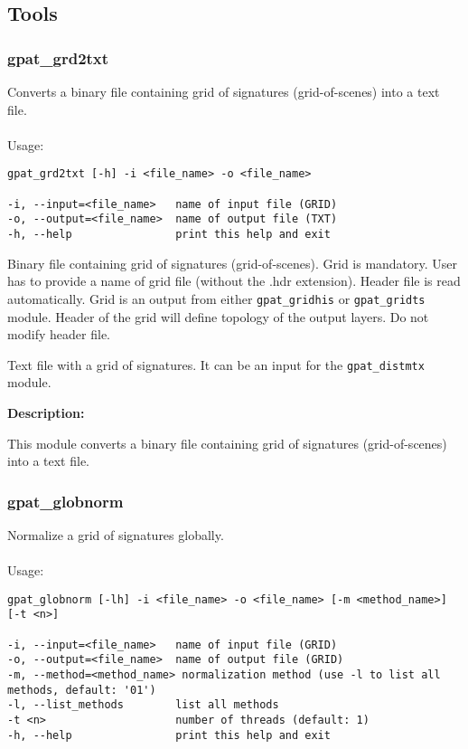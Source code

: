 \subsection{Tools}
\subsubsection{gpat\_grd2txt}
Converts a binary file containing grid of signatures (grid-of-scenes) into a text file.
\\\\
Usage:

\begin{minipage}{\linewidth}
\begin{lstlisting}
gpat_grd2txt [-h] -i <file_name> -o <file_name>

-i, --input=<file_name>   name of input file (GRID)
-o, --output=<file_name>  name of output file (TXT)
-h, --help                print this help and exit
\end{lstlisting}
\end{minipage}


Binary file containing grid of signatures (grid-of-scenes). 
Grid is mandatory. 
User has to provide a name of grid file (without the .hdr extension). 
Header file is read automatically. 
Grid is an output from either {\tt gpat\_gridhis} or {\tt gpat\_gridts} module. 
Header of the grid will define topology of the output layers. 
Do not modify header file.


Text file with a grid of signatures. 
It can be an input for the {\tt gpat\_distmtx} module.

{\bf Description:}

This module converts a binary file containing grid of signatures (grid-of-scenes) into a text file.

\subsubsection{gpat\_globnorm}
Normalize a grid of signatures globally. 
\\\\
Usage:

\begin{minipage}{\linewidth}
\begin{lstlisting}
gpat_globnorm [-lh] -i <file_name> -o <file_name> [-m <method_name>] [-t <n>]

-i, --input=<file_name>   name of input file (GRID)
-o, --output=<file_name>  name of output file (GRID)
-m, --method=<method_name> normalization method (use -l to list all methods, default: '01')
-l, --list_methods        list all methods
-t <n>                    number of threads (default: 1)
-h, --help                print this help and exit
\end{lstlisting}
\end{minipage}

